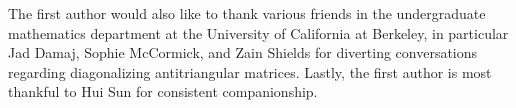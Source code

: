 \documentclass{amsart}
\begin{document}
The first author would also like to thank various friends in the undergraduate mathematics department at the University of California at Berkeley, in particular Jad Damaj, Sophie McCormick, and Zain Shields for diverting conversations regarding diagonalizing antitriangular matrices. Lastly, the first author is most thankful to Hui Sun for consistent companionship.







\printbibliography
\end{document}
